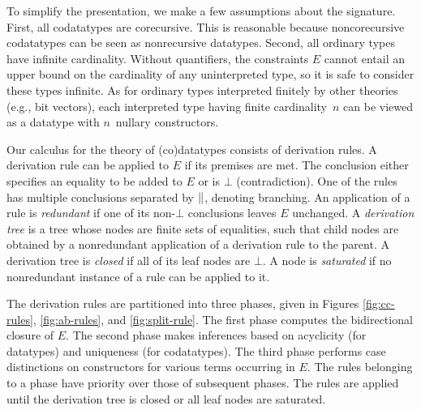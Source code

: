 \documentclass[letter]{article}
\theoremstyle{plain}
\theoremstyle{definition}
\newcommand\Sig{\mathrm{\Sigma}}
\newcommand\const[1]{\textsf{#1}}
\renewcommand{\vec}[1]{\bar #1}
\newcommand{\Ec}{E}
\newcommand\Types{\mathcalx{Y}}
\newcommand\Codata{\Types_{\mathrm{codt}}}
\newcommand\negvthinspace{\kern-0.083333em}
\begin{document}
To simplify the presentation, we make a few assumptions about
the signature. %
First, all codatatypes %
are corecursive. This is reasonable
because noncorecursive codatatypes can be seen as nonrecursive
datatypes.
Second, all ordinary types have infinite cardinality.
Without quantifiers, the constraints $\Ec$ cannot entail an upper
bound on the cardinality of any uninterpreted type, so it is safe to consider these types
infinite. As for ordinary types interpreted finitely by other theories (e.g.,
bit vectors), each interpreted type having finite cardinality~$n$
can be viewed as a %
datatype with $n$~nullary constructors.




Our calculus for the theory of (co)datatypes
consists of derivation rules.
A derivation rule can be applied to $\Ec$ if %
its premises are met.
The conclusion either specifies an equality to be added to $\Ec$
or is $\bot$ (contradiction).
One of the rules has multiple conclusions separated by $\left|\kern-.1ex\right|$,
denoting branching.
%
An application of a rule is \emph{redundant} if one of its non-$\bot$
conclusions leaves $\Ec$ unchanged.
A \emph{derivation tree} is a %
tree whose nodes are finite sets of
equalities, such that child nodes are obtained by a nonredundant application of a
derivation rule to the parent. A derivation tree is \emph{closed} if all of
its leaf nodes are $\bot$. A node is \emph{saturated} if no nonredundant
instance of a rule can be applied to it.

The derivation rules are partitioned into three phases, given in
Figures \ref{fig:cc-rules}, \ref{fig:ab-rules}, and \ref{fig:split-rule}.
The first phase computes the bidirectional closure of $\Ec$. The second
phase makes inferences based on acyclicity (for datatypes) and uniqueness
(for codatatypes).
The third phase performs case distinctions on constructors for
various terms occurring in $\Ec$.
%
The rules belonging to a phase have priority over those of %
subsequent
phases. The rules are applied until the derivation tree is closed or all leaf nodes
are saturated.
\end{document}
